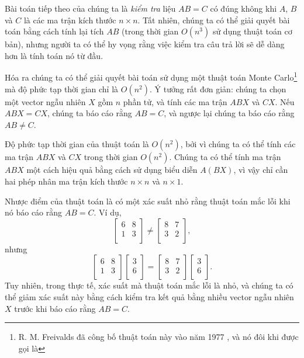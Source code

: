 
Bài toán tiếp theo của chúng ta là \emph{kiểm tra}
liệu $AB=C$ có đúng không khi $A$, $B$ và $C$
là các ma trận kích thước $n \times n$.
Tất nhiên, chúng ta có thể giải quyết bài toán
bằng cách tính lại tích $AB$
(trong thời gian $O(n^3)$ sử dụng thuật toán cơ bản),
nhưng người ta có thể hy vọng rằng việc kiểm tra
câu trả lời sẽ dễ dàng hơn là tính toán nó từ đầu.

Hóa ra chúng ta có thể giải quyết bài toán
sử dụng một thuật toán Monte Carlo\footnote{R. M. Freivalds đã công bố
thuật toán này vào năm 1977 \cite{fre77}, và nó đôi khi
được gọi là  } mà
độ phức tạp thời gian chỉ là $O(n^2)$.
Ý tưởng rất đơn giản: chúng ta chọn một vector ngẫu nhiên
$X$ gồm $n$ phần tử, và tính các ma trận
$ABX$ và $CX$. Nếu $ABX=CX$, chúng ta báo cáo rằng $AB=C$,
và ngược lại chúng ta báo cáo rằng $AB \neq C$.

Độ phức tạp thời gian của thuật toán là
$O(n^2)$, bởi vì chúng ta có thể tính các ma trận
$ABX$ và $CX$ trong thời gian $O(n^2)$.
Chúng ta có thể tính ma trận $ABX$ một cách hiệu quả
bằng cách sử dụng biểu diễn $A(BX)$, vì vậy chỉ cần hai
phép nhân ma trận kích thước $n \times n$ và $n \times 1$.

Nhược điểm của thuật toán là
có một xác suất nhỏ rằng thuật toán
mắc lỗi khi nó báo cáo rằng $AB=C$.
Ví dụ, 
\[
 \begin{bmatrix}
  6 & 8 \\
  1 & 3 \\
 \end{bmatrix}
\neq
 \begin{bmatrix}
  8 & 7 \\
  3 & 2 \\
 \end{bmatrix},
\]
nhưng
\[
 \begin{bmatrix}
  6 & 8 \\
  1 & 3 \\
 \end{bmatrix}
 \begin{bmatrix}
  3 \\
  6 \\
 \end{bmatrix}
=
 \begin{bmatrix}
  8 & 7 \\
  3 & 2 \\
 \end{bmatrix}
 \begin{bmatrix}
  3 \\
  6 \\
 \end{bmatrix}.
\]
Tuy nhiên, trong thực tế, xác suất mà
thuật toán mắc lỗi là nhỏ,
và chúng ta có thể giảm xác suất này bằng cách
kiểm tra kết quả bằng nhiều vector ngẫu nhiên $X$
trước khi báo cáo rằng $AB=C$.

